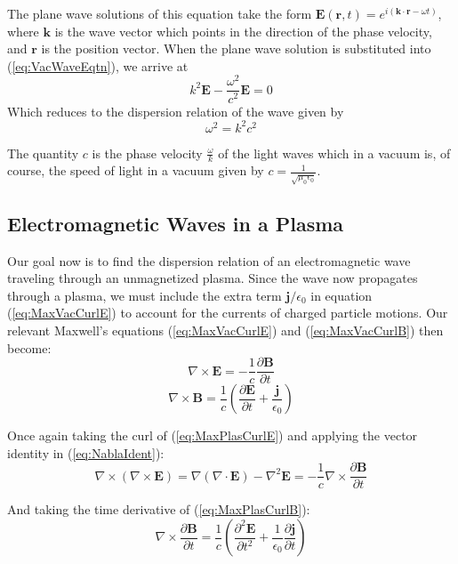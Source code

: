 \documentclass[twocolumn]{article}
\begin{document}
The plane wave solutions of this equation take the form $\mathbf{E}(\mathbf{r}, t) = e^{i(\mathbf{k} \cdot \mathbf{r} - \omega t)}$, where $\mathbf{k}$ is the wave vector which points in the direction of the phase velocity, and $\mathbf{r}$ is the position vector.
When the plane wave solution is substituted into (\ref{eq:VacWaveEqtn}), we arrive at
\begin{equation}
	k^2\mathbf{E} - \frac{\omega^2}{c^2}\mathbf{E} = 0
\end{equation}
Which reduces to the dispersion relation of the wave given by
\begin{equation}
	\omega^2 = k^2c^2
\end{equation}

The quantity $c$ is the phase velocity $\frac{\omega}{k}$ of the light waves which in a vacuum is, of course, the speed of light in a vacuum given by $c = \frac{1}{\sqrt{\mu_0\epsilon_0}}$.

\subsection*{Electromagnetic Waves in a Plasma}
Our goal now is to find the dispersion relation of an electromagnetic wave traveling through an unmagnetized plasma.
Since the wave now propagates through a plasma, we must include the extra term $\mathbf{j}/\epsilon_0$ in equation (\ref{eq:MaxVacCurlE}) to account for the currents of charged particle motions.
Our relevant Maxwell's equations (\ref{eq:MaxVacCurlE}) and (\ref{eq:MaxVacCurlB}) then become:
\begin{equation}
	\label{eq:MaxPlasCurlE}
	\nabla \times \mathbf{E} = -\frac{1}{c} \frac{\partial \mathbf{B}}{\partial t}
\end{equation}
\begin{equation}
	\label{eq:MaxPlasCurlB}
	\nabla \times \mathbf{B} = \frac{1}{c} (\frac{\partial \mathbf{E}}{\partial t} + \frac{\mathbf{j}}{\epsilon_0})
\end{equation}

Once again taking the curl of (\ref{eq:MaxPlasCurlE}) and applying the vector identity in (\ref{eq:NablaIdent}):
\begin{equation}
	\label{eq:PlasCurlCurlE}
	\nabla \times (\nabla \times \mathbf{E}) = \nabla(\nabla \cdot \mathbf{E}) - \nabla^2 \mathbf{E} = -\frac{1}{c}\nabla \times \frac{\partial \mathbf{B}}{\partial t}
\end{equation}

And taking the time derivative of (\ref{eq:MaxPlasCurlB}):
\begin{equation}
	\label{eq:PlasCurlPartialB}
	\nabla \times \frac{\partial \mathbf{B}}{\partial t} = \frac{1}{c}(\frac{\partial^2 \mathbf{E}}{\partial t^2} + \frac{1}{\epsilon_0} \frac{\partial \mathbf{j}}{\partial t})
\end{equation}
\end{document}
